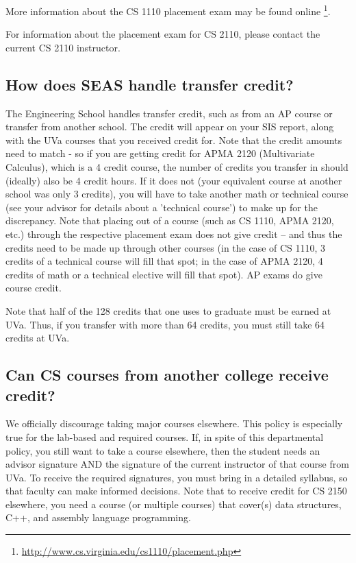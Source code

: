 \documentclass[10pt,letter]{book}
\newcommand{\myurl}[1]{\footnote{\scriptsize\url{#1}}}
\begin{document}
More information about the CS 1110 placement exam may be found online
\myurl{http://www.cs.virginia.edu/cs1110/placement.php}.

For information about the placement exam for CS 2110, please
contact the current CS 2110 instructor.

\subsection{How does SEAS handle transfer credit?}

The Engineering School handles transfer credit, such as from an AP
course or transfer from another school. The credit will appear on your
SIS report, along with the UVa courses that you received credit
for. Note that the credit amounts need to match - so if you are
getting credit for APMA 2120 (Multivariate Calculus), which is a
4 credit course, the number of credits you transfer in should
(ideally) also be 4 credit hours. If it does not (your equivalent
course at another school was only 3 credits), you will have to take
another math or technical course (see your advisor for details about a
'technical course') to make up for the discrepancy. Note that placing
out of a course (such as CS 1110, APMA 2120, etc.) through
the respective placement exam does not give credit – and thus the
credits need to be made up through other courses (in the case of CS
1110, 3 credits of a technical course will fill that spot; in
the case of APMA 2120, 4 credits of math or a technical elective
will fill that spot). AP exams do give course credit.

Note that half of the 128 credits that one uses to graduate must be
earned at UVa. Thus, if you transfer with more than 64 credits, you
must still take 64 credits at UVa.

\subsection{Can CS courses from another college receive credit?}

We officially discourage taking major courses elsewhere. This policy
is especially true for the lab-based and required courses. If, in
spite of this departmental policy, you still want to take a course
elsewhere, then the student needs an advisor signature AND the
signature of the current instructor of that course from UVa. To
receive the required signatures, you must bring in a detailed
syllabus, so that faculty can make informed decisions. Note that to
receive credit for CS 2150 elsewhere, you need a course (or
multiple courses) that cover(s) data structures, C++, and assembly
language programming.
\end{document}
